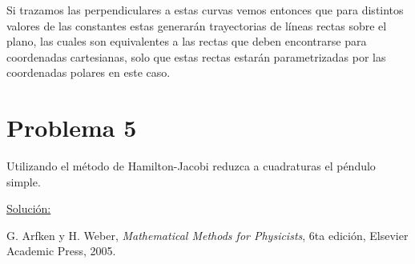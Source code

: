 \documentclass[a4paper,10pt]{article}
\numberwithin{equation}{section}
\begin{document}
Si trazamos las perpendiculares a estas curvas vemos entonces que para distintos valores de las constantes estas generarán trayectorias 
de líneas rectas sobre el plano, las cuales son equivalentes a las rectas que deben 
encontrarse para coordenadas cartesianas, solo que estas rectas estarán parametrizadas 
por las coordenadas polares en este caso.

\section{Problema 5}

Utilizando el método de Hamilton-Jacobi reduzca a cuadraturas el péndulo simple. 

\vspace{.3cm}

\underline{Solución:} \vspace{.3cm}

\begin{thebibliography}{10}
G. Arfken y H. Weber, \emph{Mathematical Methods for Physicists}, 6ta edición, Elsevier 
Academic Press, 2005.
\end{thebibliography}
\end{document}
